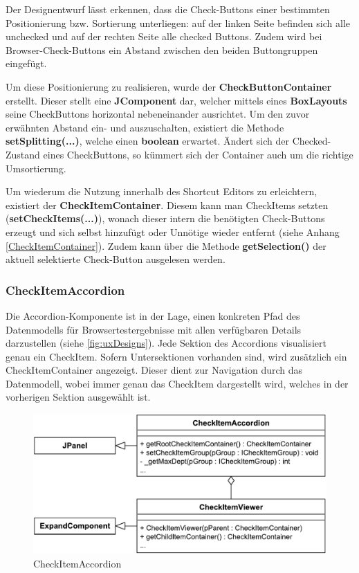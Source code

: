 Der Designentwurf lässt erkennen, dass die Check-Buttons einer bestimmten Positionierung bzw. Sortierung unterliegen: auf der linken Seite befinden sich alle unchecked und auf der rechten Seite alle checked Buttons. Zudem wird bei Browser-Check-Buttons ein Abstand zwischen den beiden Buttongruppen eingefügt. 

Um diese Positionierung zu realisieren, wurde der \textbf{CheckButtonContainer} erstellt. Dieser stellt eine \textbf{JComponent} dar, welcher mittels eines \textbf{BoxLayouts} seine CheckButtons horizontal nebeneinander ausrichtet. Um den zuvor erwähnten Abstand ein- und auszuschalten, existiert die Methode \textbf{setSplitting(...)}, welche einen \textbf{boolean} erwartet. Ändert sich der Checked-Zustand eines CheckButtons, so kümmert sich der Container auch um die richtige Umsortierung.

Um wiederum die Nutzung innerhalb des Shortcut Editors zu erleichtern, existiert der \textbf{CheckItemContainer}. Diesem kann man CheckItems setzten (\textbf{setCheckItems(...)}), wonach dieser intern die benötigten Check-Buttons erzeugt und sich selbst hinzufügt oder Unnötige wieder entfernt (siehe Anhang \ref{CheckItemContainer}). Zudem kann über die Methode \textbf{getSelection()} der aktuell selektierte Check-Button ausgelesen werden.

\subsubsection{CheckItemAccordion}

\vspace{-8px}

Die Accordion-Komponente ist in der Lage, einen konkreten Pfad des Datenmodells für Browsertestergebnisse mit allen verfügbaren Details darzustellen (siehe \autoref{fig:uxDesigns}).
Jede Sektion des Accordions visualisiert genau ein CheckItem. Sofern Untersektionen vorhanden sind, wird zusätzlich ein CheckItemContainer angezeigt. Dieser dient zur Navigation durch das Datenmodell, wobei immer genau das CheckItem dargestellt wird, welches in der vorherigen Sektion ausgewählt ist.

\begin{figure}
	\vspace{-12px}
	\centering
	\includegraphics[width=0.95\linewidth]{../graphic/diagrams/CD_CheckItemAccordion/CheckItemAccordion}
	\caption{CheckItemAccordion}
	\label{fig:checkitemaccordion}
\end{figure}


